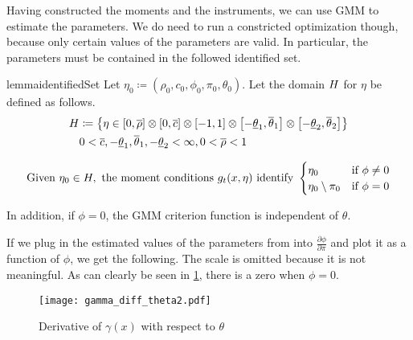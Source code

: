 \documentclass[11pt, letterpaper, twoside, final]{article}
\begin{document}
Having constructed the moments and the instruments, we can use GMM to estimate the parameters.
We do need to run a constricted optimization though, because only certain values of the parameters are valid. 
In particular, the parameters must be contained in the followed identified set.


\begin{restatable}{lemma}{identifiedSet}
    \label{lemma:IdentifiedSet}
    Let $\eta_0 \coloneqq \left(\rho_0, c_0, \phi_0, \pi_0, \theta_0\right)$.
    Let the domain $H$ for $\eta$ be defined as follows. 
    \begin{equation}
    \begin{split}
        H &\coloneqq \left\{ \eta \in  [0, \overline{\rho}] \otimes [0, \overline{c}] \otimes \left[-1,
            1\right] \otimes \left[-\underline{\theta}_1, \overline{\theta}_1\right] \otimes
            \left[-\underline{\theta}_2, \overline{\theta}_2\right]\right\} \\
        &0 < \overline{c}, -\underline{\theta}_1, \overline{\theta}_1, -\underline{\theta}_2 < \infty, 0 <
            \overline{\rho} < 1
    \end{split}
    \end{equation}


    \begin{equation}
        \text{Given}\ \eta_0 \in \Eta,\ \text{the moment conditions}\ g_t(x, \eta)\ \text{identify}\
    \begin{cases}
        \eta_0                  &\text{if}\ \phi \neq 0 \\
        \eta_0 \setminus \pi_0  &\text{if}\ \phi = 0
    \end{cases}
    \label{eqn:EtaDefn}
    \end{equation}

    In addition, if $\phi = 0$, the GMM criterion function is independent of $\theta$.
\end{restatable}


If we plug in the estimated values of the parameters from \textcite{khrapov2016affine} into $\frac{\partial
\phi}{\partial \pi}$ and plot it as a function of $\phi$,  we get the following.
The scale is omitted because it is not meaningful. 
As can clearly be seen in \cref{fig:fig:gamma_diff_theta2}, there is a zero when $\phi = 0$.

\begin{figure}[htb]
    \centering
    \caption{Derivative of $\gamma(x)$ with respect to $\theta$}
    \label{fig:fig:gamma_diff_theta2}
    \texttt{[image: gamma\_diff\_theta2.pdf]}
\end{figure}
\end{document}
